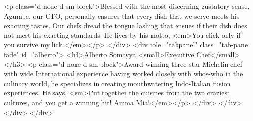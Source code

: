                         <p class="d-none d-sm-block">Blessed with the most discerning gustatory sense, Agumbe, our CTO, personally ensures that every dish that we serve meets his exacting tastes. Our chefs dread the tongue lashing that ensues if their dish does not meet his exacting standards. He lives by his motto, <em>You click only if you survive my lick.</em></p>
                    </div>
                    <div role="tabpanel" class="tab-pane fade" id="alberto">    
                        <h3>Alberto Somayya <small>Executive Chef</small></h3>
                        <p class="d-none d-sm-block">Award winning three-star Michelin chef with wide International experience having worked closely with whos-who in the culinary world, he specializes in creating mouthwatering Indo-Italian fusion experiences. He says, <em>Put together the cuisines from the two craziest cultures, and you get a winning hit! Amma Mia!</em></p>
                    </div>
                </div>
            </div>
       </div>